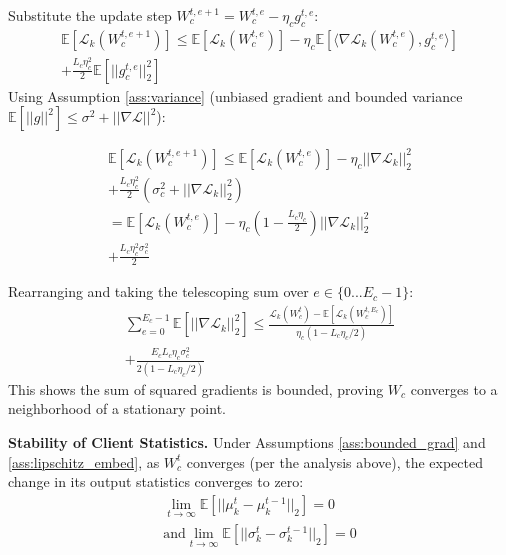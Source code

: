 Substitute the update step $W_c^{t,e+1} = W_c^{t,e} - \eta_c g_c^{t,e}$:
\begin{multline}
    \mathbb{E}[\mathcal{L}_k(W_c^{t,e+1})]  \le \mathbb{E}[\mathcal{L}_k(W_c^{t,e})] - \eta_c \mathbb{E}[\langle \nabla \mathcal{L}_k(W_c^{t,e}), g_c^{t,e} \rangle] \\
    + \frac{L_c \eta_c^2}{2} \mathbb{E}[||g_c^{t,e}||_2^2]
\end{multline}
Using Assumption \cref{ass:variance} (unbiased gradient and bounded variance $\mathbb{E}[||g||^2] \le \sigma^2 + ||\nabla \mathcal{L}||^2$):

\begin{multline}
    \mathbb{E}[\mathcal{L}_k(W_c^{t,e+1})] \le \mathbb{E}[\mathcal{L}_k(W_c^{t,e})] - \eta_c ||\nabla \mathcal{L}_k||_2^2 \\
        + \frac{L_c \eta_c^2}{2} (\sigma_c^2 + ||\nabla \mathcal{L}_k||_2^2) \\
    = \mathbb{E}[\mathcal{L}_k(W_c^{t,e})] - \eta_c\left(1 - \frac{L_c \eta_c}{2}\right) ||\nabla \mathcal{L}_k||_2^2 \\
    + \frac{L_c \eta_c^2 \sigma_c^2}{2}
\end{multline}

Rearranging and taking the telescoping sum over $e \in \{0...E_c-1\}$:
\begin{multline}
    \sum_{e=0}^{E_c-1} \mathbb{E}[||\nabla \mathcal{L}_k||_2^2] \le \frac{\mathcal{L}_k(W_c^t) - \mathbb{E}[\mathcal{L}_k(W_c^{t, E_c})]}{\eta_c(1 - L_c\eta_c/2)} \\ 
    + \frac{E_c L_c \eta_c \sigma_c^2}{2(1 - L_c\eta_c/2)}
\end{multline}
This shows the sum of squared gradients is bounded, proving $W_c$ converges to a neighborhood of a stationary point.


\noindent\textbf{Stability of Client Statistics.}
Under Assumptions \cref{ass:bounded_grad} and \cref{ass:lipschitz_embed}, as $W_c^t$ converges (per the analysis above), the expected change in its output statistics converges to zero:
\begin{multline}
    \lim_{t \to \infty} \mathbb{E}[||\mu_k^t - \mu_k^{t-1}||_2] = 0 \\ \text{and}  \lim_{t \to \infty} \mathbb{E}[||\sigma_k^t - \sigma_k^{t-1}||_2] = 0
\end{multline}


